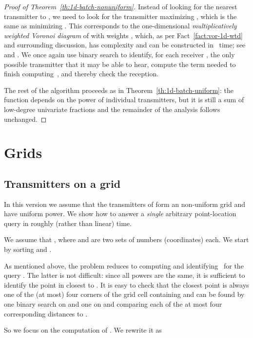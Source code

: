 \documentclass[11pt]{article}
\theoremstyle{remark}
\begin{document}
\begin{proof}[Proof of Theorem~\ref{th:1d-batch-nonuniform}]
  Instead of looking for the nearest transmitter to , we need to
  look for the transmitter maximizing , which is
  the same as minimizing .  This corresponds to the
  one-dimensional \emph{multiplicatively weighted Voronoi diagram} of
   with weights , which, as per Fact~\ref{fact:vor-1d-wtd} and surrounding discussion, has complexity  and can be constructed 
  in~ time; see \cite{a-odwvd-86} and
  \cite[Theorem~6.1]{sa-dsstg-95}.  We once again use binary search to
  identify, for each receiver , the only possible transmitter
   that it may be able to hear, compute the term
   needed to finish computing~, and thereby
  check the reception.


  The rest of the algorithm proceeds as in
  Theorem~\ref{th:1d-batch-uniform}: the function  depends on the
  power of individual transmitters, but it is still a sum of 
  low-degree univariate fractions and the remainder of the analysis follows unchanged.
\end{proof}
\fi

\iffalse
\section{Grids}
\subsection{Transmitters on a grid}
\label{sec:trans-grid}



In this version we assume that the transmitters of  form an 
non-uniform grid and have uniform power.  We show how to answer a \emph{single}
arbitrary point-location query in roughly  (rather than linear)
time.

We assume that , where  and  are two sets of 
numbers (coordinates) each.  We start by sorting  and .  

As mentioned above, the problem reduces to computing  and
identifying~ for the query .  The latter is not
difficult: since all powers are the same, it is
sufficient to identify the point in  closest to .  It is
easy to check that the closest point is always one of the (at most) four
corners of the grid cell containing  and can be found by one binary search on
 and one on  and comparing each of the at most four corresponding
distances to . 

So we focus on the computation of .  We rewrite it as
 
\end{document}
